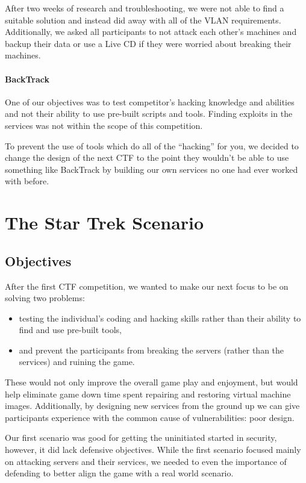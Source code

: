 \documentclass[10pt]{article}
\begin{document}
After two weeks of research and troubleshooting, we were not able to find a
suitable solution and instead did away with all of the VLAN requirements.
Additionally, we asked all participants to not attack each other's machines and
backup their data or use a Live CD if they were worried about breaking their
machines.

\paragraph*{BackTrack} One of our objectives was to test competitor's hacking
knowledge and abilities and not their ability to use pre-built scripts and
tools. Finding exploits in the services was not within the scope of this
competition. 

To prevent the use of tools which do all of the ``hacking'' for you, we decided
to change the design of the next CTF to the point they wouldn't be able to use
something like BackTrack by building our own services no one had ever worked
with before. 

\section{The Star Trek Scenario}
\subsection{Objectives}
After the first CTF competition, we wanted to make our next focus to be on
solving two problems:
\begin{itemize}
	\item testing the individual's coding and hacking skills rather than their
	ability to find and use pre-built tools,
	\item and prevent the participants from breaking the servers (rather than the
	services) and ruining the game.
\end{itemize}

These would not only improve the overall game play and enjoyment, but would
help eliminate game down time spent repairing and restoring virtual machine
images. Additionally, by designing new services from the ground up we can
give participants experience with the common cause of vulnerabilities: poor
design.

Our first scenario was good for getting the uninitiated started in security,
however, it did lack defensive objectives. While the first scenario focused
mainly on attacking servers and their services, we needed to even the importance
of defending to better align the game with a real world scenario.
\end{document}
